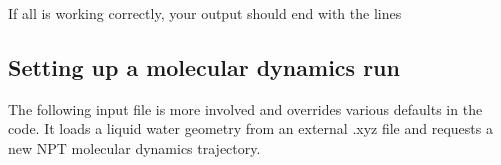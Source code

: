 \documentclass[letterpaper,10pt,english]{sphinxmanual}
\begin{document}
\begin{sphinxVerbatim}[commandchars=\\\{\}]
       
\end{sphinxVerbatim}

If all is working correctly, your output should end with the lines

\begin{sphinxVerbatim}[commandchars=\\\{\}]
  
    

      
           
         
        
       
\end{sphinxVerbatim}


\subsection{Setting up a molecular dynamics run}
\label{\detokenize{quickstart:setting-up-a-molecular-dynamics-run}}
The following input file is more involved and overrides various defaults in the
code. It loads a liquid water geometry from an external .xyz file and requests a
new NPT molecular dynamics trajectory.
\end{document}
